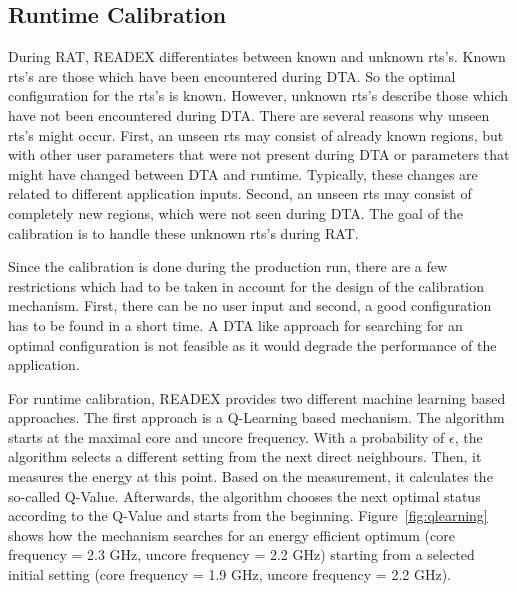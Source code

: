 \subsection{Runtime Calibration} \label{sec:calibration}

During RAT, READEX differentiates between known and unknown rts's. 
Known rts's are those which have been encountered during DTA. So the optimal configuration for the rts's is known. However, unknown rts's describe those which have not been encountered during DTA. There are several reasons why unseen rts's might occur. First, an unseen rts may consist of already known regions, but with other user parameters that were not present during DTA or parameters that might have changed between DTA and runtime. Typically, these changes are related to different application inputs. Second, an unseen rts may consist of completely new regions, which were not seen during DTA. The goal of the calibration is to handle these unknown rts's during RAT.

Since the calibration is done during the production run, there are a few restrictions which had to be taken in account for the design of the calibration mechanism. First, there can be no user input and second, a good configuration has to be found in a short time. A DTA like approach for searching for an optimal configuration is not feasible as it would degrade the performance of the application.

For runtime calibration, READEX provides two different machine learning based approaches. The first approach is a Q-Learning based mechanism. The algorithm starts at the maximal core and uncore frequency. With a probability of {$\epsilon$}, the algorithm selects a different setting from the next direct neighbours. Then, it measures the energy at this point. Based on the measurement, it calculates the so-called Q-Value. Afterwards, the algorithm chooses the next optimal status according to the Q-Value and starts from the beginning. Figure~\ref{fig:qlearning} shows how the mechanism searches for an energy efficient optimum (core frequency = 2.3 GHz, uncore frequency = 2.2 GHz) starting from a selected initial setting (core frequency = 1.9 GHz, uncore frequency = 2.2 GHz).

